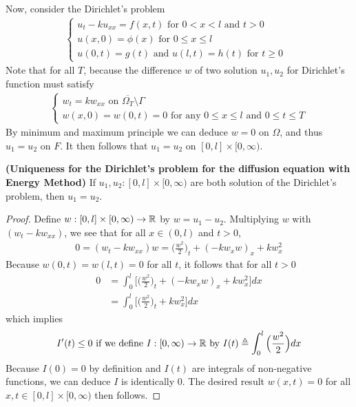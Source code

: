 \documentclass{report}
\begin{document}
\begin{mdframed}
Now, consider the Dirichlet's problem 
\begin{align}
\label{Dirichlet's problem}
\begin{cases}
u_t-ku_{xx}=f(x,t)\text{ for }0<x<l\text{ and }t>0 \\
u(x,0)=\phi (x)\text{ for $0\leq x\leq l$ }\\
u(0,t)=g(t)\text{ and }u(l,t)=h(t)\text{ for $t\geq 0$ }
\end{cases}
\end{align}
Note that for all $T$, because the difference $w$ of two solution  $u_1,u_2$ for Dirichlet's function must satisfy 
\begin{align*}
\begin{cases}
  w_t=kw_{xx}\text{ on }\overline{\Omega_T}\setminus  \Gamma \\
  w(x,0)=w(0,t)=0\text{ for any }0\leq x\leq l\text{ and }0\leq t\leq T
\end{cases}
\end{align*}
By minimum and maximum principle we can deduce $w=0$ on  $\Omega$, and thus  $u_1=u_2$ on  $F$. It then follows that  $u_1=u_2$ on  $[0,l]\times [0,\infty)$. 
\end{mdframed}
\begin{theorem}
\textbf{(Uniqueness for the Dirichlet's problem for the diffusion equation with Energy Method)} If $u_1,u_2:[0,l]\times [0,\infty)$ are both solution of the Dirichlet's problem, then  $u_1=u_2$. 
\end{theorem}
\begin{proof}
Define $w:[0,l]\times [0,\infty)\rightarrow \mathbb{R}$ by $w=u_1-u_2$. Multiplying $w$ with $(w_t-kw_{xx})$, we see that for all $x\in (0,l)$ and $t> 0$, 
\begin{align*}
0=(w_t-kw_{xx})w= \Big(\frac{w^2}{2}\Big)_t + (-kw_xw)_x + kw_x^2
\end{align*}
Because $w(0,t)=w(l,t)=0$ for all $t$, it follows that for all $t>0$ 
\begin{align*}
0&=\int_0^l \Big[\Big(\frac{w^2}{2}\Big)_t + (-kw_xw)_x + kw_x^2\Big]dx  \\
 &=\int_0^l \Big[\Big(\frac{w^2}{2}\Big)_t + kw_x^2\Big]dx
\end{align*}
which implies   
\begin{align*}
I'(t)\leq 0\text{ if we define }I:[0,\infty)\rightarrow \mathbb{R}\text{ by }I(t)\triangleq \int_0^l \Big(\frac{w^2}{2} \Big)dx 
\end{align*}
Because $I(0)=0$ by definition and $I(t)$ are integrals of non-negative functions, we can deduce $I$ is identically $0$. The desired result $w(x,t)=0$ for all $x,t \in [0,l]\times [0,\infty)$ then follows. 
\end{proof}
\end{document}
